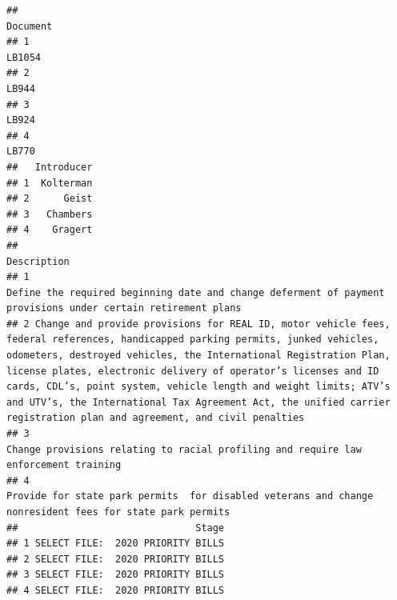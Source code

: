 \documentclass[]{book}
\begin{document}
\begin{verbatim}
##                                                                Document
## 1                                                                LB1054
## 2                                                                 LB944
## 3                                                                 LB924
## 4                                                                 LB770
##   Introducer
## 1  Kolterman
## 2      Geist
## 3   Chambers
## 4    Gragert
##                                                                                                                                                                                                                                                                                                                                                                                                                                                           Description
## 1                                                                                                                                                                                                                                                                                                                                                        Define the required beginning date and change deferment of payment provisions under certain retirement plans
## 2 Change and provide provisions for REAL ID, motor vehicle fees, federal references, handicapped parking permits, junked vehicles, odometers, destroyed vehicles, the International Registration Plan, license plates, electronic delivery of operator’s licenses and ID cards, CDL’s, point system, vehicle length and weight limits; ATV’s and UTV’s, the International Tax Agreement Act, the unified carrier registration plan and agreement, and civil penalties
## 3                                                                                                                                                                                                                                                                                                                                                                                 Change provisions relating to racial profiling and require law enforcement training
## 4                                                                                                                                                                                                                                                                                                                                                            Provide for state park permits  for disabled veterans and change nonresident fees for state park permits
##                               Stage
## 1 SELECT FILE:  2020 PRIORITY BILLS
## 2 SELECT FILE:  2020 PRIORITY BILLS
## 3 SELECT FILE:  2020 PRIORITY BILLS
## 4 SELECT FILE:  2020 PRIORITY BILLS
\end{verbatim}
\end{document}
